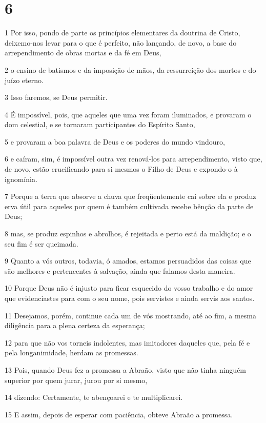 \chapter{6}

\par 1 Por isso, pondo de parte os princípios elementares da doutrina de Cristo, deixemo-nos levar para o que é perfeito, não lançando, de novo, a base do arrependimento de obras mortas e da fé em Deus,
\par 2 o ensino de batismos e da imposição de mãos, da ressurreição dos mortos e do juízo eterno.
\par 3 Isso faremos, se Deus permitir.
\par 4 É impossível, pois, que aqueles que uma vez foram iluminados, e provaram o dom celestial, e se tornaram participantes do Espírito Santo,
\par 5 e provaram a boa palavra de Deus e os poderes do mundo vindouro,
\par 6 e caíram, sim, é impossível outra vez renová-los para arrependimento, visto que, de novo, estão crucificando para si mesmos o Filho de Deus e expondo-o à ignomínia.
\par 7 Porque a terra que absorve a chuva que freqüentemente cai sobre ela e produz erva útil para aqueles por quem é também cultivada recebe bênção da parte de Deus;
\par 8 mas, se produz espinhos e abrolhos, é rejeitada e perto está da maldição; e o seu fim é ser queimada.
\par 9 Quanto a vós outros, todavia, ó amados, estamos persuadidos das coisas que são melhores e pertencentes à salvação, ainda que falamos desta maneira.
\par 10 Porque Deus não é injusto para ficar esquecido do vosso trabalho e do amor que evidenciastes para com o seu nome, pois servistes e ainda servis aos santos.
\par 11 Desejamos, porém, continue cada um de vós mostrando, até ao fim, a mesma diligência para a plena certeza da esperança;
\par 12 para que não vos torneis indolentes, mas imitadores daqueles que, pela fé e pela longanimidade, herdam as promessas.
\par 13 Pois, quando Deus fez a promessa a Abraão, visto que não tinha ninguém superior por quem jurar, jurou por si mesmo,
\par 14 dizendo: Certamente, te abençoarei e te multiplicarei.
\par 15 E assim, depois de esperar com paciência, obteve Abraão a promessa.
